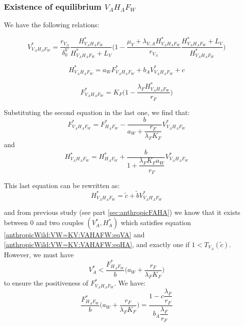 \documentclass{article}
\newcommand{\lva}{\lambda_{V, A}}
\newcommand{\lfw}{\lambda_{F}}
\newcommand{\dv}{\delta_0^V}
\begin{document}
\begin{itemize}
\begin{itemize}
%
%
%
\end{itemize}


\subsubsection{Existence of equilibrium $V_AH_AF_W$}
We have the following relations:

\begin{equation}
V^*_{V_AH_AF_W} = \dfrac{r_{V_A}}{\dv} \dfrac{H^*_{V_AH_AF_W}}{H^*_{V_AH_AF_W} + L_V} \Big(1 - \dfrac{\mu_V + \lva H^*_{V_AH_AF_W}}{r_{V_A}} \dfrac{H^*_{V_AH_AF_W} + L_V}{H^*_{V_AH_AF_W}} \Big)
\label{anthropicWild:VW=KV:VAHAFW:eqVA}
\end{equation}

$$
H^*_{V_AH_AF_W} = a_W F^*_{V_AH_AF_W} + b_A V^*_{V_AH_AF_W} + c
$$

$$
F^*_{V_AH_AF_W} = K_F\Big(1 - \dfrac{\lfw H^*_{V_AH_AF_W}}{r_F} \Big)
$$

Substituting the second equation in the last one, we find that:
$$
F^*_{V_AH_AF_W} = F^*_{H_AF_W} - \dfrac{b}{a_W + \dfrac{r_F}{\lfw K_F}} V^*_{V_AH_AF_W}
$$
and
$$
H^*_{V_AH_AF_W} = H^*_{H_AF_W} + \dfrac{b}{1 + \dfrac{\lfw K_F a_W}{r_F}} V^*_{V_AH_AF_W}
$$

This last equation can be rewritten as:
\begin{equation}
H^*_{V_AH_AF_W} = \tilde{c} + \tilde{b} V^*_{V_AH_AF_W}
\label{anthropicWild:VW=KV:VAHAFW:eqHA}
\end{equation}

and from previous study (see part \ref{sec:anthropicFAHA}) we know that it exists between 0 and two couples $(V_A^*, H_A^*)$ which satisfies equation \eqref{anthropicWild:VW=KV:VAHAFW:eqVA} and \eqref{anthropicWild:VW=KV:VAHAFW:eqHA}, and exactly one if $1 < T_{V_A}(\tilde{c})$. However, we must have 
$$
V_A^* < \dfrac{F^*_{H_AF_W}}{b} \Big(a_W + \dfrac{r_F}{\lfw K_F} \Big)
$$
to ensure the positiveness of $F^*_{V_AH_AF_W}$. We have:
$$
\dfrac{F^*_{H_AF_W}}{b} \Big(a_W + \dfrac{r_F}{\lfw K_F} \Big) = \dfrac{1 - c \dfrac{\lfw}{r_F}}{b_A \dfrac{\lfw}{r_F}}
$$

\end{itemize}
\end{document}
